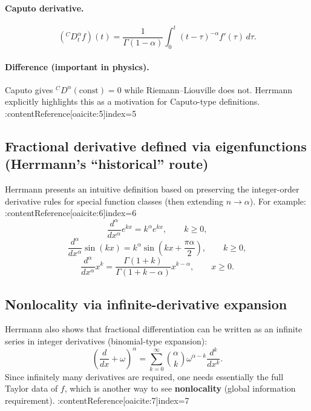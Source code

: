 \paragraph{Caputo derivative.}
\begin{equation}
({}^{C}D_t^\alpha f)(t)
=
\frac{1}{\Gamma(1-\alpha)}
\int_0^t (t-\tau)^{-\alpha}f'(\tau)\,d\tau.
\end{equation}

\paragraph{Difference (important in physics).}
Caputo gives ${}^{C}D^\alpha(\text{const})=0$ while Riemann--Liouville does not.
Herrmann explicitly highlights this as a motivation for Caputo-type definitions. :contentReference[oaicite:5]{index=5}

\subsection{Fractional derivative defined via eigenfunctions (Herrmann's ``historical'' route)}
Herrmann presents an intuitive definition based on preserving the integer-order derivative rules
for special function classes (then extending $n\to \alpha$). For example: :contentReference[oaicite:6]{index=6}
\begin{equation}
\frac{d^\alpha}{dx^\alpha}e^{kx}=k^\alpha e^{kx},
\qquad k\ge 0,
\end{equation}
\begin{equation}
\frac{d^\alpha}{dx^\alpha}\sin(kx)
=
k^\alpha\sin\!\left(kx+\frac{\pi\alpha}{2}\right),
\qquad k\ge 0,
\end{equation}
\begin{equation}
\frac{d^\alpha}{dx^\alpha}x^k
=
\frac{\Gamma(1+k)}{\Gamma(1+k-\alpha)}x^{k-\alpha},
\qquad x\ge 0.
\end{equation}

\subsection{Nonlocality via infinite-derivative expansion}
Herrmann also shows that fractional differentiation can be written as an infinite series
in integer derivatives (binomial-type expansion):
\begin{equation}
\left(\frac{d}{dx}+\omega\right)^\alpha
=
\sum_{k=0}^{\infty}\binom{\alpha}{k}\omega^{\alpha-k}\frac{d^k}{dx^k}.
\end{equation}
Since infinitely many derivatives are required, one needs essentially the full Taylor data of $f$,
which is another way to see \textbf{nonlocality} (global information requirement). :contentReference[oaicite:7]{index=7}

